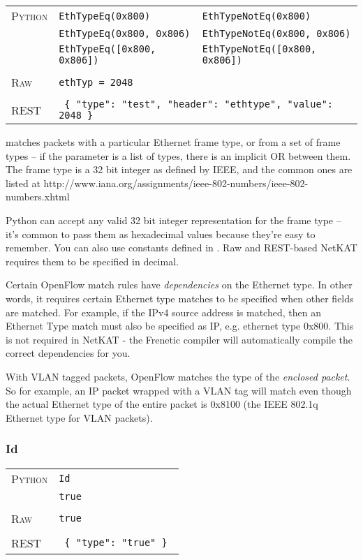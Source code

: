 \bigskip
\begin{tabularx}{\linewidth}{lXX}
\textsc{Python}   & \texttt{EthTypeEq(0x800)}    & \texttt{EthTypeNotEq(0x800)} \\
    & \texttt{EthTypeEq(0x800, 0x806)}  & \texttt{EthTypeNotEq(0x800, 0x806)} \\
    & \texttt{EthTypeEq([0x800, 0x806])}  & \texttt{EthTypeNotEq([0x800, 0x806])} \\ \\
\textsc{Raw}    & \texttt{ethTyp = 2048}     & \\ \\
\textsc{REST} & \multicolumn{2}{l}{\texttt{ \{ "type": "test", "header": "ethtype", "value": 2048 \} }} 
\end{tabularx}

 matches packets with a particular Ethernet frame type, or from a set of frame types -- if the
parameter is a list of types, there is an implicit OR between them.  The frame type is a 32 bit 
integer as defined by IEEE, and the common ones are listed at 
http://www.iana.org/assignments/ieee-802-numbers/ieee-802-numbers.xhtml

Python can accept any valid 32 bit integer representation for the frame type -- it's common to pass them
as hexadecimal values because they're easy to remember.  You can also use constants defined in 
.  Raw and REST-based NetKAT requires them to be specified in
decimal.

Certain OpenFlow match rules have \emph{dependencies} on the Ethernet type.  
In other words, it requires certain Ethernet type matches to be specified when other fields are matched.  For 
example, if the IPv4 source address is matched, then an Ethernet Type match must also be specified as 
IP, e.g. ethernet type 0x800.  This is not required in NetKAT - the Frenetic compiler will 
automatically compile the correct dependencies for you. 

With VLAN tagged packets, OpenFlow matches the
type of the \emph{enclosed packet}.  So for example, an IP packet wrapped with a VLAN tag will match 
 even though the actual Ethernet type of the entire packet is 0x8100 (the 
IEEE 802.1q Ethernet type for VLAN packets).  

\subsubsection{Id}

\bigskip
\begin{tabularx}{\linewidth}{lX}
\textsc{Python}   & \texttt{Id} \\
   & \texttt{true} \\ \\
\textsc{Raw}    & \texttt{true}  \\ \\
\textsc{REST} & \texttt{ \{ "type": "true" \} } 
\end{tabularx}

